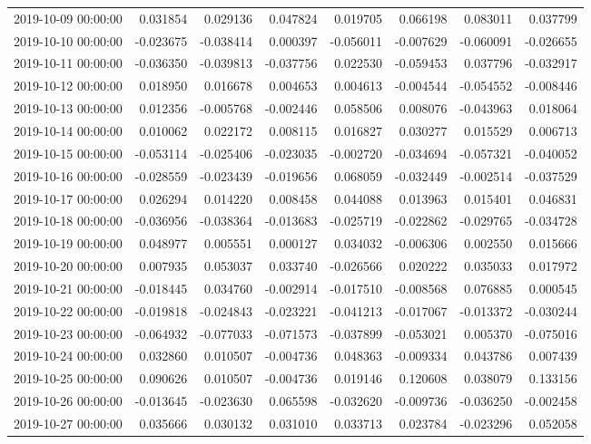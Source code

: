 \begin{tabular}{lrrrrrrr}
2019-10-09 00:00:00 & 0.031854 & 0.029136 & 0.047824 & 0.019705 & 0.066198 & 0.083011 & 0.037799 \\
2019-10-10 00:00:00 & -0.023675 & -0.038414 & 0.000397 & -0.056011 & -0.007629 & -0.060091 & -0.026655 \\
2019-10-11 00:00:00 & -0.036350 & -0.039813 & -0.037756 & 0.022530 & -0.059453 & 0.037796 & -0.032917 \\
2019-10-12 00:00:00 & 0.018950 & 0.016678 & 0.004653 & 0.004613 & -0.004544 & -0.054552 & -0.008446 \\
2019-10-13 00:00:00 & 0.012356 & -0.005768 & -0.002446 & 0.058506 & 0.008076 & -0.043963 & 0.018064 \\
2019-10-14 00:00:00 & 0.010062 & 0.022172 & 0.008115 & 0.016827 & 0.030277 & 0.015529 & 0.006713 \\
2019-10-15 00:00:00 & -0.053114 & -0.025406 & -0.023035 & -0.002720 & -0.034694 & -0.057321 & -0.040052 \\
2019-10-16 00:00:00 & -0.028559 & -0.023439 & -0.019656 & 0.068059 & -0.032449 & -0.002514 & -0.037529 \\
2019-10-17 00:00:00 & 0.026294 & 0.014220 & 0.008458 & 0.044088 & 0.013963 & 0.015401 & 0.046831 \\
2019-10-18 00:00:00 & -0.036956 & -0.038364 & -0.013683 & -0.025719 & -0.022862 & -0.029765 & -0.034728 \\
2019-10-19 00:00:00 & 0.048977 & 0.005551 & 0.000127 & 0.034032 & -0.006306 & 0.002550 & 0.015666 \\
2019-10-20 00:00:00 & 0.007935 & 0.053037 & 0.033740 & -0.026566 & 0.020222 & 0.035033 & 0.017972 \\
2019-10-21 00:00:00 & -0.018445 & 0.034760 & -0.002914 & -0.017510 & -0.008568 & 0.076885 & 0.000545 \\
2019-10-22 00:00:00 & -0.019818 & -0.024843 & -0.023221 & -0.041213 & -0.017067 & -0.013372 & -0.030244 \\
2019-10-23 00:00:00 & -0.064932 & -0.077033 & -0.071573 & -0.037899 & -0.053021 & 0.005370 & -0.075016 \\
2019-10-24 00:00:00 & 0.032860 & 0.010507 & -0.004736 & 0.048363 & -0.009334 & 0.043786 & 0.007439 \\
2019-10-25 00:00:00 & 0.090626 & 0.010507 & -0.004736 & 0.019146 & 0.120608 & 0.038079 & 0.133156 \\
2019-10-26 00:00:00 & -0.013645 & -0.023630 & 0.065598 & -0.032620 & -0.009736 & -0.036250 & -0.002458 \\
2019-10-27 00:00:00 & 0.035666 & 0.030132 & 0.031010 & 0.033713 & 0.023784 & -0.023296 & 0.052058 \\

\end{tabular}
